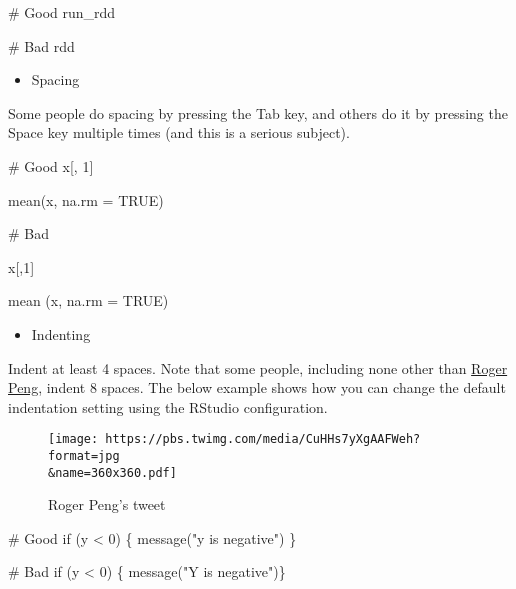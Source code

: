 \documentclass[
  letterpaper,
  DIV=11,
  numbers=noendperiod]{scrreprt}
\newenvironment{Shaded}{\begin{snugshade}}{\end{snugshade}}
\newcommand{\AttributeTok}[1]{\textcolor[rgb]{0.40,0.45,0.13}{#1}}
\newcommand{\CommentTok}[1]{\textcolor[rgb]{0.37,0.37,0.37}{#1}}
\newcommand{\ConstantTok}[1]{\textcolor[rgb]{0.56,0.35,0.01}{#1}}
\newcommand{\ControlFlowTok}[1]{\textcolor[rgb]{0.00,0.23,0.31}{#1}}
\newcommand{\DecValTok}[1]{\textcolor[rgb]{0.68,0.00,0.00}{#1}}
\newcommand{\FunctionTok}[1]{\textcolor[rgb]{0.28,0.35,0.67}{#1}}
\newcommand{\NormalTok}[1]{\textcolor[rgb]{0.00,0.23,0.31}{#1}}
\newcommand{\SpecialCharTok}[1]{\textcolor[rgb]{0.37,0.37,0.37}{#1}}
\newcommand{\StringTok}[1]{\textcolor[rgb]{0.13,0.47,0.30}{#1}}
\providecommand{\tightlist}{%
  \setlength{\itemsep}{0pt}\setlength{\parskip}{0pt}}\usepackage{longtable,booktabs,array}
\begin{document}
\begin{Shaded}
\begin{Highlighting}[]
\CommentTok{\# Good }
\NormalTok{run\_rdd }

\CommentTok{\# Bad }
\NormalTok{rdd}
\end{Highlighting}
\end{Shaded}

\begin{itemize}
\tightlist
\item
  Spacing
\end{itemize}

Some people do spacing by pressing the Tab key, and others do it by
pressing the Space key multiple times (and this is a serious subject).

\begin{Shaded}
\begin{Highlighting}[]
\CommentTok{\# Good}
\NormalTok{x[, }\DecValTok{1}\NormalTok{] }

\FunctionTok{mean}\NormalTok{(x, }\AttributeTok{na.rm =} \ConstantTok{TRUE}\NormalTok{) }

\CommentTok{\# Bad}

\NormalTok{x[,}\DecValTok{1}\NormalTok{]}

\FunctionTok{mean}\NormalTok{ (x, }\AttributeTok{na.rm =} \ConstantTok{TRUE}\NormalTok{)}
\end{Highlighting}
\end{Shaded}

\begin{itemize}
\tightlist
\item
  Indenting
\end{itemize}

Indent at least 4 spaces. Note that some people, including none other
than
\href{https://simplystatistics.org/2018/07/27/why-i-indent-my-code-8-spaces/}{Roger
Peng}, indent 8 spaces. The below example shows how you can change the
default indentation setting using the RStudio configuration.

\begin{figure}

{\centering \texttt{[image: https://pbs.twimg.com/media/CuHHs7yXgAAFWeh?format=jpg\\\&name=360x360.pdf]}

}

\caption{Roger Peng's tweet}

\end{figure}

\begin{Shaded}
\begin{Highlighting}[]
\CommentTok{\# Good}
\ControlFlowTok{if}\NormalTok{ (y }\SpecialCharTok{\textless{}} \DecValTok{0}\NormalTok{) \{}
  \FunctionTok{message}\NormalTok{(}\StringTok{"y is negative"}\NormalTok{)}
\NormalTok{\}}

\CommentTok{\# Bad}
\ControlFlowTok{if}\NormalTok{ (y }\SpecialCharTok{\textless{}} \DecValTok{0}\NormalTok{) \{}
\FunctionTok{message}\NormalTok{(}\StringTok{"Y is negative"}\NormalTok{)\}}
\end{Highlighting}
\end{Shaded}
\end{document}
